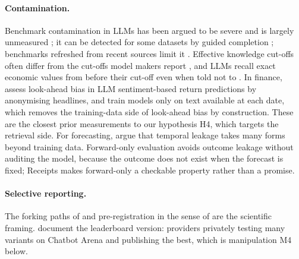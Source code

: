 \documentclass[11pt]{article}
\begin{document}
\paragraph{Contamination.} Benchmark contamination in LLMs has been argued to be severe and is largely unmeasured \citep{sainz2023contamination}; it can be detected for some datasets by guided completion \citep{golchin2023timetravel}; benchmarks refreshed from recent sources limit it \citep{white2024livebench}. Effective knowledge cut-offs often differ from the cut-offs model makers report \citep{cheng2024dated}, and LLMs recall exact economic values from before their cut-off even when told not to \citep{lopezlira2025memorization}. In finance, \citet{glasserman2023lookahead} assess look-ahead bias in LLM sentiment-based return predictions by anonymising headlines, and \citet{he2025chrono} train models only on text available at each date, which removes the training-data side of look-ahead bias by construction. These are the closest prior measurements to our hypothesis H4, which targets the retrieval side. For forecasting, \citet{paleka2025pitfalls} argue that temporal leakage takes many forms beyond training data. Forward-only evaluation avoids outcome leakage without auditing the model, because the outcome does not exist when the forecast is fixed; Receipts makes forward-only a checkable property rather than a promise.

\paragraph{Selective reporting.} The forking paths of \citet{gelman2014crisis} and pre-registration in the sense of \citet{nosek2018} are the scientific framing. \citet{singh2025leaderboard} document the leaderboard version: providers privately testing many variants on Chatbot Arena and publishing the best, which is manipulation M4 below.
\end{document}
